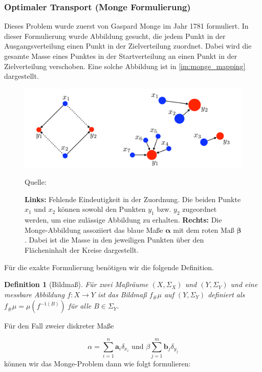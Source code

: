 \documentclass[11pt,a4paper]{article}
\newcommand{\source}[1]{\caption*{\hfill Quelle: {#1}} }
\newtheorem{definition}[theorem]{Definition}
\numberwithin{equation}{section}
\begin{document}
	
	\subsubsection{Optimaler Transport (Monge Formulierung)}
	
	Dieses Problem wurde zuerst von Gaspard Monge im Jahr 1781 formuliert. In dieser Formulierung wurde Abbildung gesucht, die jedem Punkt in der Ausgangsverteilung einen Punkt in der Zielverteilung zuordnet. Dabei wird die gesamte Masse eines Punktes in der Startverteilung an einen Punkt in der Zielverteilung verschoben. Eine solche Abbildung ist in \autoref{im:monge_mapping} dargestellt.
	
	\begin{figure}[ht]
		\centering
		\includegraphics[width=0.3\textheight]{monge_mapping.png}
		\caption[Monge-Abbildung]{\textbf{Links:} Fehlende Eindeutigkeit in der Zuordnung. Die beiden Punkte $x_1$ und $x_2$ können sowohl den Punkten $y_1$ bzw. $y_2$ zugeordnet werden, um eine zulässige Abbildung zu erhalten. \textbf{Rechts:} Die Monge-Abbildung assoziiert das blaue Maße $\boldsymbol{\alpha}$ mit dem roten Maß $\boldsymbol{\beta}$. Dabei ist die Masse in den jeweiligen Punkten über den Flächeninhalt der Kreise dargestellt.}
		\source{\cite{COTcuturi}}
		\label{im:monge_mapping}
	\end{figure}
	
	Für die exakte Formulierung benötigen wir die folgende Definition.
	
	\begin{definition}[Bildmaß]
		Für zwei Maßräume $(X,\Sigma_X)$ und $(Y,\Sigma_Y)$ und eine messbare Abbildung $f:X\to Y$ ist das Bildmaß $f_\#\mu$ auf $(Y,\Sigma_Y)$ definiert als $f_\#\mu = \mu (f^{-1(B)})$ für alle $B \in \Sigma_Y$.
	\end{definition}
	
	Für den Fall zweier diskreter Maße
	
	\begin{equation}
	\alpha = \sum_{i=1}^n{\boldsymbol{a}_i\delta_{x_i}} \text{ und } \beta \sum_{j=1}^m{\boldsymbol{b}_j\delta_{y_j}}
	\end{equation}
	können wir das Monge-Problem dann wie folgt formulieren:
	
\end{document}
